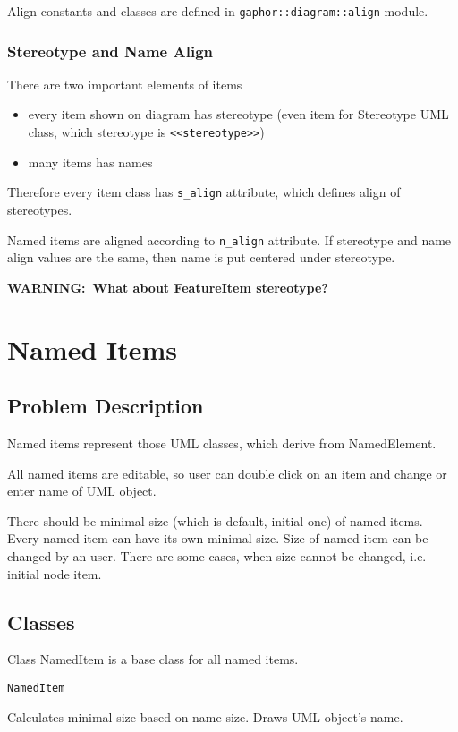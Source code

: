 \documentclass[draft]{book}
\newcommand{\rmodule}[1]{\texttt{#1}}
\newcommand{\rattr}[1]{\texttt{#1}}
\newcommand{\rstereotype}[1]{\texttt{<<#1>>}}
\newcommand{\warning}[1]{\textbf{WARNING:~#1}}
\newlength{\dscwidth}
\newcommand{\dlabel}[1]{\par\noindent\makebox[6em][r]{\textbf{#1:}}\hspace{1em}}
\newenvironment{entitydesc}{%
\dlabel{Description}%
\begin{minipage}[t]{\dscwidth}
}{%
\end{minipage}
}
\newenvironment{class}[1]{%
\dlabel{\underline{Class}}\texttt{#1}\nopagebreak[4]
}{%
\par\vspace{2em}
}
\begin{document}
Align constants and classes are defined in \rmodule{gaphor::diagram::align} module.

\subsection{Stereotype and Name Align}

There are two important elements of items
\begin{itemize}
\item every item shown on diagram has stereotype (even item for Stereotype
    UML class, which stereotype is \rstereotype{stereotype})
\item many items has names
\end{itemize}

Therefore every item class has \rattr{s\_align} attribute, which defines
align of stereotypes.

Named items are aligned according to \rattr{n\_align} attribute. If
stereotype and name align values are the same, then name is put
centered under stereotype.

\warning{What about FeatureItem stereotype?}

\chapter{Named Items}
\section{Problem Description}
Named items represent those UML classes, which derive from NamedElement.

All named items are editable, so user can double click on an item and
change or enter name of UML object.

There should be minimal size (which is default, initial one) of named
items. Every named item can have its own minimal size. Size of named item
can be changed by an user. There are some cases, when size cannot be
changed, i.e. initial node item.


\section{Classes}
Class NamedItem is a base class for all named items.

\begin{class}{NamedItem}
\begin{entitydesc}
Calculates minimal size based on name size. Draws UML object's name.
\end{entitydesc}
\end{class}
\end{document}

